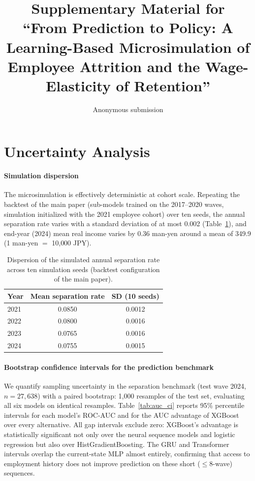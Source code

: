 \documentclass[letterpaper]{article}
\title{Supplementary Material for\\ ``From Prediction to Policy: A Learning-Based Microsimulation of Employee Attrition and the Wage-Elasticity of Retention''}
\author{Anonymous submission}
\begin{document}
\maketitle

\section{Uncertainty Analysis}

\paragraph{Simulation dispersion}
The microsimulation is effectively deterministic at cohort scale. Repeating the
backtest of the main paper (sub-models trained on the 2017--2020 waves,
simulation initialized with the 2021 employee cohort) over ten seeds, the
annual separation rate varies with a standard deviation of at most 0.002
(Table~\ref{tab:sim_dispersion}), and end-year (2024) mean real income varies
by 0.36 man-yen around a mean of 349.9 (1 man-yen $=$ 10{,}000 JPY).

\begin{table}[h]
\centering
\begin{tabular}{lcc}
\toprule
Year & Mean separation rate & SD (10 seeds) \\
\midrule
2021 & 0.0850 & 0.0012 \\
2022 & 0.0800 & 0.0016 \\
2023 & 0.0765 & 0.0016 \\
2024 & 0.0755 & 0.0015 \\
\bottomrule
\end{tabular}
\caption{Dispersion of the simulated annual separation rate across ten
simulation seeds (backtest configuration of the main paper).}
\label{tab:sim_dispersion}
\end{table}

\paragraph{Bootstrap confidence intervals for the prediction benchmark}
We quantify sampling uncertainty in the separation benchmark (test wave 2024,
$n=27{,}638$) with a paired bootstrap: 1{,}000 resamples of the test set,
evaluating all six models on identical resamples. Table~\ref{tab:auc_ci}
reports 95\% percentile intervals for each model's ROC-AUC and for the AUC
advantage of XGBoost over every alternative. All gap intervals exclude zero:
XGBoost's advantage is statistically significant not only over the neural
sequence models and logistic regression but also over HistGradientBoosting.
The GRU and Transformer intervals overlap the current-state MLP almost
entirely, confirming that access to employment history does not improve
prediction on these short ($\le 8$-wave) sequences.
\end{document}
